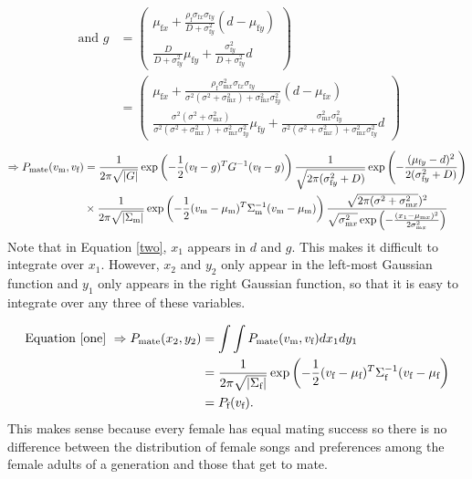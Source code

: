 \documentclass{article}
\newcommand{\x}[1]{\text{#1}}
\begin{document}
\begin{align*}
\\ \text{ and } g & = \left(\begin{array}{cc}\mu_{\x{f}x}+\frac{\rho_\x{f}\sigma_{\x{f}x}\sigma_{\x{f}y}}{D+\sigma_{\x{f}y}^2}(d-\mu_{\x{f}y})
\\ \frac{D}{D+\sigma_{\x{f}y}^2}\mu_{\x{f}y}+\frac{\sigma_{\x{f}y}^2}{D+\sigma_{\x{f}y}^2}d \end{array} \right) 
\\&=\left(\begin{array}{cc}\mu_{\x{f}x}+\frac{\rho_\x{f}\sigma_{\x{m}x}^2\sigma_{\x{f}x}\sigma_{\x{f}y}}{\sigma^2(\sigma^2+\sigma_{\x{m}x}^2)+\sigma_{\x{m}x}^2\sigma_{\x{f}y}^2}(d-\mu_{\x{f}x})
\\ \frac{\sigma^2(\sigma^2+\sigma_{\x{m}x}^2)}{\sigma^2(\sigma^2+\sigma_{\x{m}x}^2)+\sigma_{\x{m}x}^2\sigma_{\x{f}y}^2}\mu_{\x{f}y}+\frac{\sigma_{\x{m}x}^2\sigma_{\x{f}y}^2}{\sigma^2(\sigma^2+\sigma_{\x{m}x}^2)+\sigma_{\x{m}x}^2\sigma_{\x{f}y}^2}d \end{array} \right)
\end{align*}
\begin{align} 
\Rightarrow P_\x{mate}(v_\x{m},v_\x{f})&=\frac{1}{2\pi\sqrt{|G|}}\exp\left(-\frac{1}{2}(v_\x{f}-g)^TG^{-1}(v_\x{f}-g)\right)\frac{1}{\sqrt{2\pi(\sigma_{\x{f}y}^2+D)}}\exp\left(-\frac{(\mu_{\x{f}y}-d)^2}{2(\sigma_{\x{f}y}^2+D)}\right) \notag
\\&\times \frac{1}{2\pi\sqrt{|\Sigma_\x{m}|}}\exp\left(-\frac{1}{2}(v_\x{m}-\mu_\x{m})^T\Sigma_\x{m}^{-1}(v_\x{m}-\mu_\x{m})\right)\frac{\sqrt{2\pi(\sigma^2+\sigma_{\x{m}x}^2})^2}{\sqrt{\sigma_{\x{m}x}^2}\exp\left(-\frac{(x_1-\mu_{\x{m}x})^2}{2\sigma_{\x{m}x}^2}\right)}\label{two}
\end{align}
Note that in Equation \ref{two}, $x_1$ appears in $d$ and $g$. This makes it difficult to integrate over $x_1$. However, $x_2$ and $y_2$ only appear in the left-most Gaussian function and $y_1$ only appears in the right Gaussian function, so that it is easy to integrate over any three of these variables.

\begin{align*}
\text{Equation \ref{one} } \Rightarrow P_\text{mate}(x_2,y_2)&=\int \int P_\text{mate}(v_\x{m},v_\x{f})dx_1dy_1
\\&=\frac{1}{2\pi\sqrt{|\Sigma_\x{f}|}}\exp\left(-\frac{1}{2}(v_\x{f}-\mu_\x{f})^T\Sigma_\x{f}^{-1}(v_\x{f}-\mu_\x{f}\right)
\\&=P_\x{f}(v_\x{f}).
\end{align*}
This makes sense because every female has equal mating success so there is no difference between the distribution of female songs and preferences among the female adults of a generation and those that get to mate.
\end{document}
